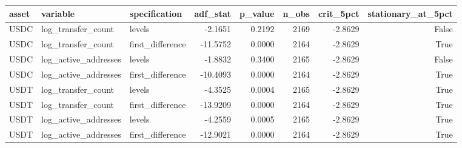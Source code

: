 \begin{tabular}{lllrrrrr}
\toprule
asset & variable & specification & adf_stat & p_value & n_obs & crit_5pct & stationary_at_5pct \\
\midrule
USDC & log_transfer_count & levels & -2.1651 & 0.2192 & 2169 & -2.8629 & False \\
USDC & log_transfer_count & first_difference & -11.5752 & 0.0000 & 2164 & -2.8629 & True \\
USDC & log_active_addresses & levels & -1.8832 & 0.3400 & 2165 & -2.8629 & False \\
USDC & log_active_addresses & first_difference & -10.4093 & 0.0000 & 2164 & -2.8629 & True \\
USDT & log_transfer_count & levels & -4.3525 & 0.0004 & 2165 & -2.8629 & True \\
USDT & log_transfer_count & first_difference & -13.9209 & 0.0000 & 2164 & -2.8629 & True \\
USDT & log_active_addresses & levels & -4.2559 & 0.0005 & 2165 & -2.8629 & True \\
USDT & log_active_addresses & first_difference & -12.9021 & 0.0000 & 2164 & -2.8629 & True \\
\bottomrule
\end{tabular}
